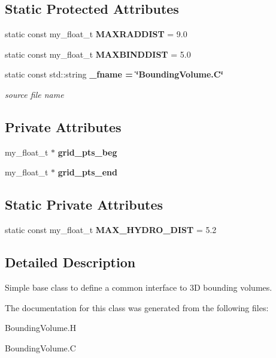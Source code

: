 \subsection*{Static Protected Attributes}
\begin{CompactItemize}
\item 
static const my\_\-float\_\-t \textbf{MAXRADDIST} = 9.0\label{classSimSite3D_1_1BoundingVolume_a1cfa33783949f5c420c9887d6e51060}

\item 
static const my\_\-float\_\-t \textbf{MAXBINDDIST} = 5.0\label{classSimSite3D_1_1BoundingVolume_2309329304fbe3f248255dac05b91aa8}

\item 
static const std::string \bf{\_\-fname} = \char`\"{}Bounding\-Volume.C\char`\"{}\label{classSimSite3D_1_1BoundingVolume_ab8b9606c0e2f06271e6de0fbbae62af}

\begin{CompactList}\small\item\em source file name \item\end{CompactList}\end{CompactItemize}
\subsection*{Private Attributes}
\begin{CompactItemize}
\item 
my\_\-float\_\-t $\ast$ \textbf{grid\_\-pts\_\-beg}\label{classSimSite3D_1_1BoundingVolume_0c620a298e09563e4b8e63c4122a3864}

\item 
my\_\-float\_\-t $\ast$ \textbf{grid\_\-pts\_\-end}\label{classSimSite3D_1_1BoundingVolume_7cedadbeb63b343521502aacfed7f273}

\end{CompactItemize}
\subsection*{Static Private Attributes}
\begin{CompactItemize}
\item 
static const my\_\-float\_\-t \textbf{MAX\_\-HYDRO\_\-DIST} = 5.2\label{classSimSite3D_1_1BoundingVolume_bd0078867dd8810c162dc6c2cf096e6e}

\end{CompactItemize}


\subsection{Detailed Description}
Simple base class to define a common interface to 3D bounding volumes. 



The documentation for this class was generated from the following files:\begin{CompactItemize}
\item 
Bounding\-Volume.H\item 
Bounding\-Volume.C\end{CompactItemize}
